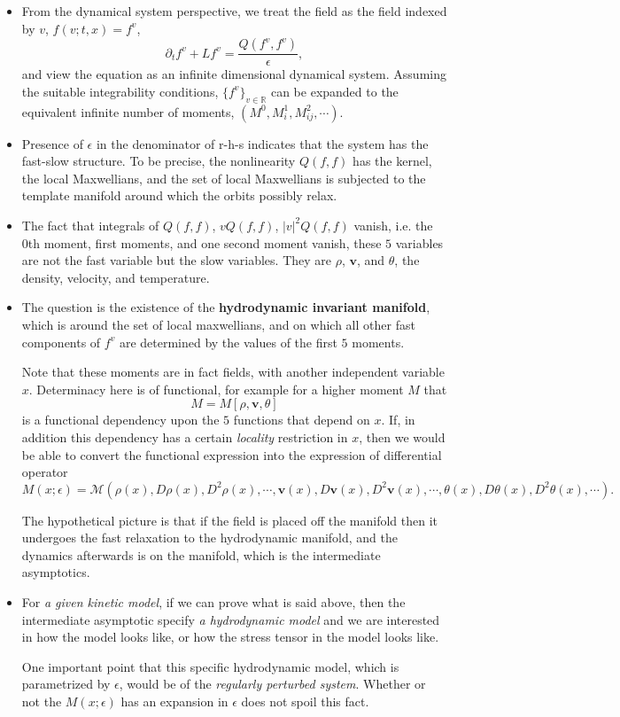 \documentclass[a4paper,12pt]{article}
\begin{document}
\begin{itemize}
 \item From the dynamical system perspective, we treat the field as the field indexed by $v$, $f(v;t,x)=f^v$,
$$ \partial_t f^{v} + Lf^{v} = \frac{Q(f^v,f^v)}{\epsilon}, $$
and view the equation as an infinite dimensional dynamical system. Assuming the suitable integrability conditions, $\{f^v\}_{v\in \mathbb{R}}$ can be expanded to the equivalent infinite number of moments, $(M^0, M^1_{i}, M^2_{ij}, \cdots)$.
 \item Presence of $\epsilon$ in the denominator of r-h-s indicates that the system has the fast-slow structure. To be precise, the nonlinearity $Q(f,f)$ has the kernel, the local Maxwellians, and the set of local Maxwellians is subjected to the template manifold around which the orbits possibly relax.
 \item  The fact that integrals of $Q(f,f)$, $vQ(f,f)$, $|v|^2 Q(f,f)$ vanish, i.e. the 0th moment, first moments, and one second moment vanish, these $5$ variables are not the fast variable but the slow variables. They are $\rho$, $\mathbf{v}$, and $\theta$, the density, velocity, and temperature.
 \item The question is the existence of the {\bf hydrodynamic invariant manifold}, which is around the set of local maxwellians, and on which all other fast components of $f^v$ are determined by the values of the first $5$ moments. 
 
 Note that these moments are in fact fields, with another independent variable $x$. Determinacy here is of functional, for example for a higher moment $M$ that
 $$M = M[\rho,\mathbf{v},\theta]$$
 is a functional dependency upon the $5$ functions that depend on $x$. If, in addition this dependency has a certain {\it locality} restriction in $x$, then we would be able to convert the functional expression into the expression of differential operator
 $$M(x;\epsilon)= \mathcal{M}(\rho(x),D\rho(x),D^2\rho(x), \cdots, \mathbf{v}(x), D\mathbf{v}(x), D^2\mathbf{v}(x), \cdots, \theta(x), D\theta(x), D^2\theta(x), \cdots).$$
 
 The hypothetical picture is that if the field is placed off the manifold then it undergoes the fast relaxation to the hydrodynamic manifold, and the dynamics afterwards is on the manifold, which is the intermediate asymptotics. 
 \item For {\it a given kinetic model}, if we can prove what is said above, then the intermediate asymptotic specify {\it a hydrodynamic model} and we are interested in how the model looks like, or how the stress tensor in the model looks like. 
 
 One important point that this specific hydrodynamic model, which is parametrized by $\epsilon$, would be of the {\it regularly perturbed system}. Whether or not the $M(x;\epsilon)$ has an expansion in $\epsilon$ does not spoil this fact.
\end{itemize}
\end{document}
